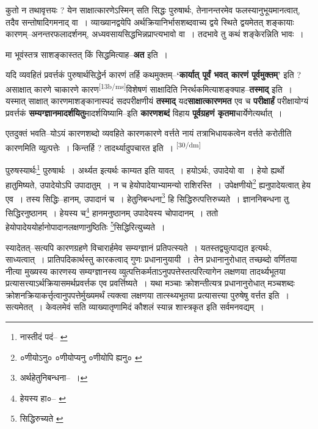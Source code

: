 \documentclass[article,12pt,a4paper]{memoir}
\begin{document}
	  \pstart कुतो न तथावृत्तयः ? येन साक्षात्कारणेऽस्मिन् सति सिद्धः पुरुषार्थः, तेनानन्तरमेव फलस्यानुभूयमानत्वात्, तदैव सन्तोषादिगमनाद् वा । व्याख्यानद्वयेपि अर्थक्रियानिर्भासशब्दवाच्य द्वये स्थिते द्वयमेतत् शङ्कायाः कारणम्--अनन्तरफलादर्शनम्, अध्यवसायसिद्धभिन्नप्राप्त्यभावो वा । तदभावे तु कथं शङ्केरन्निति भावः ।
	\pend
      

	  \pstart मा भूवंस्तत्र साशङ्कास्तत् किं सिद्धमित्याह--\textbf{अत} इति ।
	\pend
      

	  \pstart यदि व्यवहितं प्रवर्त्तकं पुरुषार्थसिद्धेर्न कारणं तर्हि कथमुक्तम्--\textbf{‘कार्यात् पूर्वं भवत् कारणं पूर्वमुक्तम्’} इति ? असाक्षात् कारणे चाकारणे कारण\leavevmode\textsuperscript{\rmlatinfont\tiny [13b/ms]}विशेषणं साक्षादिति निरर्थकमित्याशङ्क्याह--\textbf{तस्माद्} इति । यस्मात् साक्षात् कारणमाशङ्कानास्पदं सदपरीक्षणीयं \textbf{तस्माद्} यद\textbf{साक्षात्कारणमत} एव च \textbf{परीक्षार्हं} परीक्षायोग्यं प्रवर्त्तकं \textbf{सम्यग्ज्ञानमादर्शयितु}मादर्शयिष्यामि--इति \textbf{कारणशब्दं} विहाय \textbf{पूर्वग्रहणं कृतमा}चार्येणेत्यर्थात् ।
	\pend
      

	  \pstart एतदुक्तं भवति--योऽयं कारणशब्दो व्यवहिते कारणकारणे वर्त्तते नायं तत्राभिधायकत्वेन वर्त्तते करोतीति कारणमिति व्युत्पत्तेः । किन्तर्हि ? तादर्थ्यादुपचारत इति ।
	\pend
      \leavevmode\textsuperscript{\rmlatinfont\tiny [30/dm]}

	  \pstart पुरुषस्यार्थः\footnote{नास्तीदं पदं--\cite{dp-msA} \cite{dp-msB} \cite{dp-msD} \cite{dp-edP} \cite{dp-edH} \cite{dp-edE} \cite{dp-edN}} पुरुषार्थः । अर्थ्यत इत्यर्थः काम्यत इति यावत् । हयोऽर्थः, उपादेयो वा । हेयो ह्यर्थो हातुमिष्यते, उपादेयोऽपि उपादातुम् । न च हेयोपादेयाभ्यामन्यो राशिरस्ति । उपेक्षणीयो\footnote{०णीयोऽनु० \cite{dp-msA} ०णीयोप्यनु \cite{dp-msB} \cite{dp-edH} \cite{dp-edN} ०णीयोपि ह्यनु० \cite{dp-msC} \cite{dp-msD}} ह्यनुपादेयत्वात् हेय एव । तस्य सिद्धिः--हानम्, उपादानं च । हेतुनिबन्धना\footnote{अर्थहेतुनिबन्धना--\cite{dp-msD-n} ।} हि सिद्धिरुत्पत्तिरुच्यते । ज्ञाननिबन्धना तु सिद्धिरनुष्ठानम् । हेयस्य च\footnote{हेयस्य हा०--\cite{dp-msA} \cite{dp-msB} \cite{dp-edP} \cite{dp-edH} \cite{dp-edE} \cite{dp-edN}} हानमनुष्ठानम् उपादेयस्य चोपादानम् । ततो हेयोपादेययोर्हानोपादानलक्षणानुष्ठितिः \footnote{सिद्धिरुच्यते \cite{dp-msB}}सिद्धिरित्युच्यते ।
	\pend
      

	  \pstart स्यादेतत्--सत्यपि कारणग्रहणे विचारार्हमेव सम्यग्ज्ञानं प्रतिपत्स्यते । यतस्तद्व्युत्पाद्यत इत्यर्थः, साध्यत्वात् । प्रातिपदिकार्थस्तु कारकत्वाद् गुणः प्रधानानुयायी । तेन प्रधानानुरोधात् तच्छब्दो वर्णितया नीत्या मुख्यस्य कारणस्य सम्यग्ज्ञानस्य व्युत्पत्तिकर्मताऽनुपपत्तेस्तत्परित्यागेन लक्षणया तादर्थ्यभूतया प्रत्यासत्त्याऽर्थक्रियासमर्थप्रवर्त्तक एव प्रवर्त्तिष्यते । यथा मञ्चाः क्रोशन्तीत्यत्र प्रधानानुरोधात् मञ्चशब्दः क्रोशनक्रियाकर्त्तृत्वानुपपत्तेर्मुख्यमर्थं त्यक्त्वा लक्षणया तात्स्थ्यभूतया प्रत्यासत्त्या पुरुषेषु वर्त्तत इति । सत्यमेतत् । केवलमेवं सति व्याख्यातृणामिदं कौशलं स्यान्न शास्त्रकृत इति सर्वमनवद्यम् ।
	\pend
      
\end{document}
